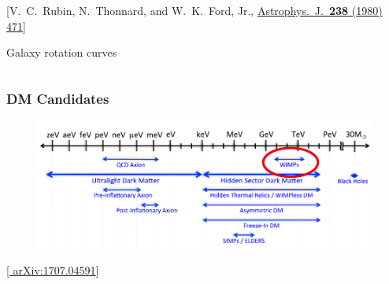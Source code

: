 \documentclass[10pt,aspectratio=169]{beamer}
\begin{document}
\begin{frame}
\begin{columns}[t]
\begin{column}{0.3\textwidth}
      \vspace*{-25pt}
      \begin{center}
        { \tiny [V.~C.~Rubin, N.~Thonnard, and W.~K.~Ford, Jr.,
            \href{http://doi.org/10.1086/158003}{%
              Astrophys.~J.~\textbf{238} (1980) 471}] }
      \end{center}
      \vspace*{-17pt}
      \begin{center}
        Galaxy rotation curves
      \end{center}
    \end{column}
  \end{columns}
\end{frame}

\begin{frame}
  \frametitle{DM Candidates}
  \begin{figure}
    \centering
    \includegraphics[width=\textwidth]{dmcandidates}
  \end{figure}
  \vspace*{-20pt}
  \begin{center}
    {\tiny [\href{http://arxiv.org/abs/1707.04591}{%
          arXiv:1707.04591}]}
  \end{center}
\end{frame}
\end{document}
